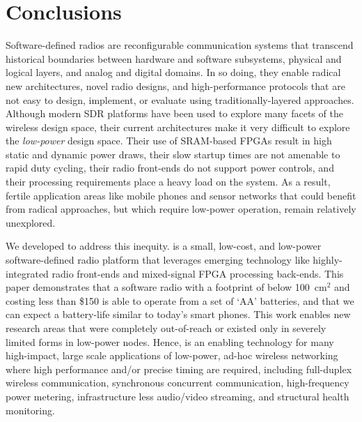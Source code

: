 \section{Conclusions}
\label{sec:conc}

Software-defined radios are reconfigurable communication systems that
transcend historical boundaries between hardware and software subsystems,
physical and logical layers, and analog and digital domains.  In so doing,
they enable radical new architectures, novel radio designs, and
high-performance protocols that are not easy to design, implement, or evaluate
using traditionally-layered approaches.  Although modern SDR platforms have
been used to explore many facets of the wireless design space, their current
architectures make it very difficult to explore the {\em low-power} design
space.  Their use of SRAM-based FPGAs result in high static and dynamic power
draws, their slow startup times are not amenable to rapid duty cycling, their
radio front-ends do not support power controls, and their processing
requirements place a heavy load on the system.  As a result, fertile
application areas like mobile phones and sensor networks that could benefit
from radical approaches, but which require low-power operation, remain
relatively unexplored.

We developed \sdr to address this inequity. \sdr is a small, low-cost, and
low-power software-defined radio platform that leverages emerging technology
like highly-integrated radio front-ends and mixed-signal FPGA processing
back-ends. This paper demonstrates that a software radio with a footprint of
below 100~cm$^2$ and costing less than \$150 is able to operate from a
set of `AA' batteries, and that we can expect a battery-life similar to
today's smart phones. This work enables new research areas that were completely
out-of-reach or existed only in severely limited forms in low-power nodes.
Hence, \sdr is an enabling technology for many high-impact, large scale
applications of low-power, ad-hoc wireless networking where high performance
and/or precise timing are required, including full-duplex wireless
communication, synchronous concurrent communication, high-frequency power
metering, infrastructure less audio/video streaming, and structural health
monitoring.
